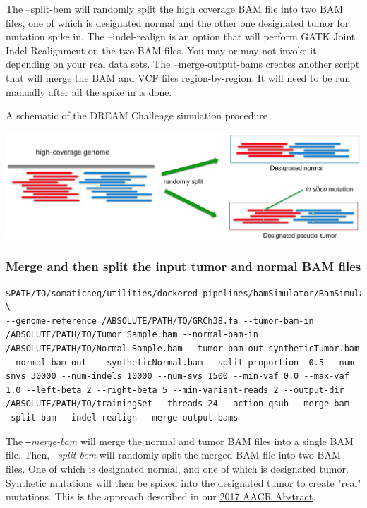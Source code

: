 \documentclass[10pt,letterpaper]{article}
\begin{document}
\begin{sloppypar}
The --split-bem will randomly split the high coverage BAM file into two BAM files, one of which is designated normal and the other one designated tumor for mutation spike in. The --indel-realign is an option that will perform GATK Joint Indel Realignment on the two BAM files. You may or may not invoke it depending on your real data sets. The --merge-output-bams creates another script that will merge the BAM and VCF files region-by-region. It will need to be run manually after all the spike in is done.

A schematic of the DREAM Challenge simulation procedure

\begin{center}
 \includegraphics[width=6.5in]{../utilities/dockered_pipelines/bamSimulator/dream_sim.jpg}
\end{center}



\subsubsection{Merge and then split the input tumor and normal BAM files}

\begin{lstlisting}
$PATH/TO/somaticseq/utilities/dockered_pipelines/bamSimulator/BamSimulator_multiThreads.sh \
--genome-reference /ABSOLUTE/PATH/TO/GRCh38.fa --tumor-bam-in /ABSOLUTE/PATH/TO/Tumor_Sample.bam --normal-bam-in /ABSOLUTE/PATH/TO/Normal_Sample.bam --tumor-bam-out syntheticTumor.bam --normal-bam-out    syntheticNormal.bam --split-proportion  0.5 --num-snvs 30000 --num-indels 10000 --num-svs 1500 --min-vaf 0.0 --max-vaf 1.0 --left-beta 2 --right-beta 5 --min-variant-reads 2 --output-dir /ABSOLUTE/PATH/TO/trainingSet --threads 24 --action qsub --merge-bam --split-bam --indel-realign --merge-output-bams
\end{lstlisting}

The \textit{\texttt{--}merge-bam} will merge the normal and tumor BAM files into a single BAM file. Then, \textit{\texttt{--}split-bem} will randomly split the merged BAM file into two BAM files. One of which is designated normal, and one of which is designated tumor. Synthetic mutations will then be spiked into the designated tumor to create "real" mutations. This is the approach described in our \href{http://dx.doi.org/10.1158/1538-7445.AM2017-386}{2017 AACR Abstract}.



\end{sloppypar}
\end{document}
